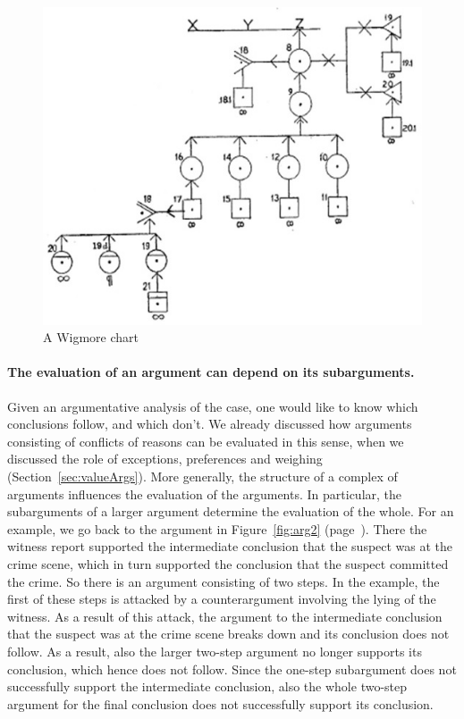 \documentclass[10pt]{article}
\begin{document}
\begin{figure}[bt]
	\centering
		\includegraphics[scale=0.7]{img/wigmore.jpg}
\caption{A Wigmore chart\label{fig:wigmore}}
\end{figure}

\paragraph{The evaluation of an argument can depend on its subarguments.}Given an argumentative analysis of the case, one would like to know which conclusions follow, and which don't. We already discussed how arguments consisting of conflicts of reasons can be evaluated in this sense, when we discussed the role of exceptions, preferences and weighing (Section~\ref{sec:valueArgs}). More generally, the structure of a complex of arguments influences the evaluation of the arguments. In particular, the subarguments of a larger argument determine the evaluation of the whole. For an example, we go back to the argument in Figure~\ref{fig:arg2} (page~\pageref{fig:arg2}). There the witness report supported the intermediate conclusion that the suspect was at the crime scene, which in turn supported the conclusion that the suspect committed the crime. So there is an argument consisting of two steps. In the example, the first of these steps is attacked by a counterargument involving the lying of the witness. As a result of this attack, the argument to the intermediate conclusion that the suspect was at the crime scene breaks down and its conclusion does not follow. As a result, also the larger two-step argument no longer supports its conclusion, which hence does not follow. Since the one-step subargument does not successfully support the intermediate conclusion, also the whole two-step argument for the final conclusion does not successfully support its conclusion.
\end{document}
